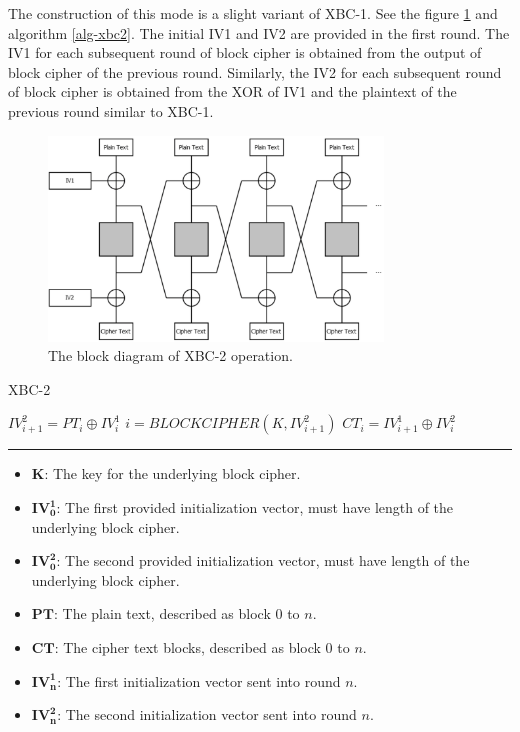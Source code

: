 \documentclass[conference]{IEEEtran}
\begin{document}
The construction of this mode is a slight variant of XBC-1. See the figure \ref{fig_xbc2} and algorithm \ref{alg-xbc2}. The initial IV1 and IV2 are provided in the first round. The IV1 for each subsequent round of block cipher is obtained from the output of block cipher of the previous round. Similarly, the IV2 for each subsequent round of block cipher is obtained from the XOR of IV1 and the plaintext of the previous round similar to XBC-1.

\begin{figure}[!t]
\centering
\includegraphics[width=3.5in]{xbc2.png}
\caption{The block diagram of XBC-2 operation.}
\label{fig_xbc2}
\end{figure}

\begin{algorithm}
 \caption{XBC-2}
 \label{alg-xbc2}
 \begin{algorithmic}
 \STATE $IV_{i+1}^2 = PT_i \oplus IV_{i}^1$
 \STATE $i = BLOCKCIPHER(K, IV_{i+1}^2)$
 \STATE $CT_i = IV_{i+1}^1 \oplus IV_{i}^2$
 \ENDFOR
 \end{algorithmic}

 \noindent\rule{3.5in}{0.4pt}

 \begin{itemize}
   \item {$\mathbf{K}$}: The key for the underlying block cipher.
   \item {$\mathbf{IV_0^1}$}: The first provided initialization vector, must have length of the underlying block cipher.
   \item {$\mathbf{IV_0^2}$}: The second provided initialization vector, must have length of the underlying block cipher.
   \item {$\mathbf{PT}$}: The plain text, described as block $0$ to $n$.
   \item {$\mathbf{CT}$}: The cipher text blocks, described as block $0$ to $n$.
   \item {$\mathbf{IV_n^1}$}: The first initialization vector sent into round $n$.
   \item {$\mathbf{IV_n^2}$}: The second initialization vector sent into round $n$.
 \end{itemize}
\end{algorithm}
\end{document}
